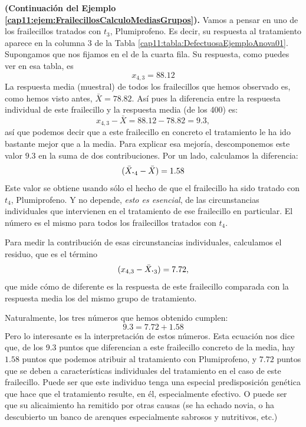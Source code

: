 \begin{ejemplo}{\bf (Continuación del Ejemplo \ref{cap11:ejem:FrailecillosCalculoMediasGrupos}).}
\label{cap11:ejem:FrailecillosCalculoMediasGrupos-a}
Vamos a pensar en uno de los frailecillos tratados con $t_3$, Plumiprofeno. Es decir, su respuesta al tratamiento aparece en la columna $3$ de la Tabla \ref{cap11:tabla:DefectuosaEjemploAnova01}. Supongamos que nos fijamos en el de la cuarta fila. Su respuesta, como puedes ver en esa tabla, es
\[x_{4,3}=88.12\]
La respuesta media (muestral) de todos los frailecillos que hemos observado es, como hemos visto antes, $\bar{X}=78.82$. Así pues la diferencia entre la respuesta individual de este frailecillo y la respuesta media (de los 400) es:
\[x_{4,3}  - \bar X = 88.12 - 78.82 = 9.3,\]
así que podemos decir que a este frailecillo en concreto el tratamiento le ha ido bastante mejor que a la media. Para explicar esa mejoría, descomponemos este valor $9.3$ en la suma de dos contribuciones. Por un lado, calculamos la diferencia:
\[(\bar X_{\mbox{\bf\large$\cdot$}4}-\bar X)=  1.58\]
Este valor se obtiene usando sólo el hecho de que el frailecillo ha sido tratado con $t_4$,  Plumiprofeno. Y no depende, {\em esto es esencial}, de las circunstancias individuales que intervienen en el tratamiento de ese frailecillo en particular. El número es el mismo para todos los frailecillos tratados con $t_4$.

Para medir la contribución de esas circunstancias individuales, calculamos el residuo, que es el término
\[(x_{4,3}-\bar X_{\mbox{\bf\large $\cdot$}3})= 7.72,\]
que mide cómo de diferente es la respuesta de este frailecillo comparada con la respuesta media los del mismo grupo de tratamiento.

Naturalmente, los tres números que hemos obtenido cumplen:
\[9.3 = 7.72 + 1.58\]
Pero lo interesante es la interpretación de estos números. Esta ecuación nos dice que, de los 9.3 puntos que diferencian a este frailecillo concreto de la media, hay $1.58$ puntos que podemos atribuir al tratamiento con Plumiprofeno, y $7.72$ puntos que se deben a características individuales del tratamiento en el caso de este frailecillo. Puede ser que este individuo tenga una especial predisposición genética que hace que el tratamiento resulte, en él, especialmente efectivo. O puede ser que su alicaimiento ha remitido por otras causas (se ha echado novia, o ha descubierto un banco de arenques especialmente sabrosos y nutritivos, etc.)
\end{ejemplo}

